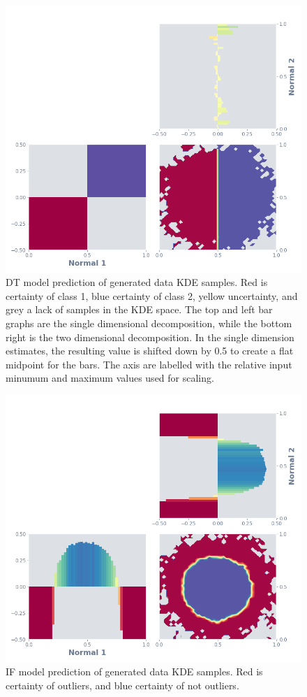 \documentclass[a4paper, twocolumn]{article}
\begin{document}
\begin{figure}
\centering
\includegraphics[width=0.8\columnwidth]{img/gen_dt.png}
\caption{DT model prediction of generated data KDE samples. Red is certainty of class 1, blue certainty of class 2, yellow uncertainty, and grey a lack of samples in the KDE space. The top and left bar graphs are the single dimensional decomposition, while the bottom right is the two dimensional decomposition. In the single dimension estimates, the resulting value is shifted down by 0.5 to create a flat midpoint for the bars. The axis are labelled with the relative input minumum and maximum values used for scaling.}
\label{fig:gen-dt}
\end{figure}

\begin{figure}
\centering
\includegraphics[width=0.8\columnwidth]{img/gen_if.png}
\caption{IF model prediction of generated data KDE samples. Red is certainty of outliers, and blue certainty of not outliers.}
\label{fig:gen-if}
\end{figure}
\end{document}
